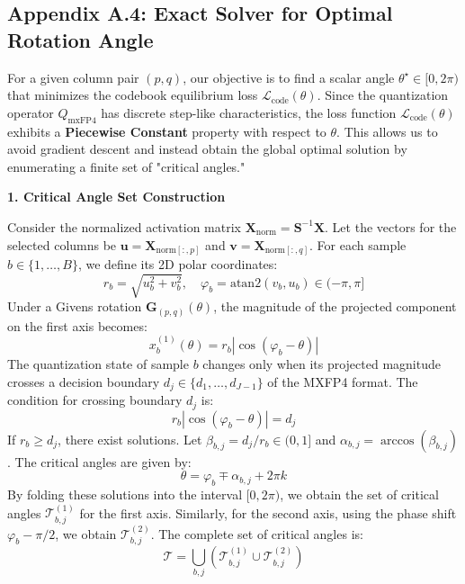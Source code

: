 \subsection*{Appendix A.4: Exact Solver for Optimal Rotation Angle}
\label{app:exact_solver}

For a given column pair $(p, q)$, our objective is to find a scalar angle $\theta^\star \in [0, 2\pi)$ that minimizes the codebook equilibrium loss $\mathcal{L}_{\text{code}}(\theta)$. Since the quantization operator $Q_{\text{mxFP4}}$ has discrete step-like characteristics, the loss function $\mathcal{L}_{\text{code}}(\theta)$ exhibits a \textbf{Piecewise Constant} property with respect to $\theta$. This allows us to avoid gradient descent and instead obtain the global optimal solution by enumerating a finite set of "critical angles."

\textbf{1. Critical Angle Set Construction}

Consider the normalized activation matrix $\mathbf{X}_{\text{norm}} = \mathbf{S}^{-1}\mathbf{X}$. Let the vectors for the selected columns be $\mathbf{u} = \mathbf{X}_{\text{norm}[:, p]}$ and $\mathbf{v} = \mathbf{X}_{\text{norm}[:, q]}$. For each sample $b \in \{1, \dots, B\}$, we define its 2D polar coordinates:
\begin{equation}
r_b = \sqrt{u_b^2 + v_b^2}, \quad \varphi_b = \mathrm{atan2}(v_b, u_b) \in (-\pi, \pi]
\end{equation}
Under a Givens rotation $\mathbf{G}_{(p,q)}(\theta)$, the magnitude of the projected component on the first axis becomes:
\begin{equation}
x^{(1)}_b(\theta) = r_b |\cos(\varphi_b - \theta)|
\end{equation}
The quantization state of sample $b$ changes only when its projected magnitude crosses a decision boundary $d_j \in \{d_1, \dots, d_{J-1}\}$ of the MXFP4 format. The condition for crossing boundary $d_j$ is:
\begin{equation}
r_b |\cos(\varphi_b - \theta)| = d_j
\end{equation}
If $r_b \ge d_j$, there exist solutions. Let $\beta_{b,j} = d_j/r_b \in (0, 1]$ and $\alpha_{b,j} = \arccos(\beta_{b,j})$. The critical angles are given by:
\begin{equation}
\theta = \varphi_b \mp \alpha_{b,j} + 2\pi k
\end{equation}
By folding these solutions into the interval $[0, 2\pi)$, we obtain the set of critical angles $\mathcal{T}_{b,j}^{(1)}$ for the first axis. Similarly, for the second axis, using the phase shift $\varphi_b - \pi/2$, we obtain $\mathcal{T}_{b,j}^{(2)}$. The complete set of critical angles is:
\begin{equation}
\mathcal{T} = \bigcup_{b,j} \left( \mathcal{T}_{b,j}^{(1)} \cup \mathcal{T}_{b,j}^{(2)} \right)
\end{equation}

